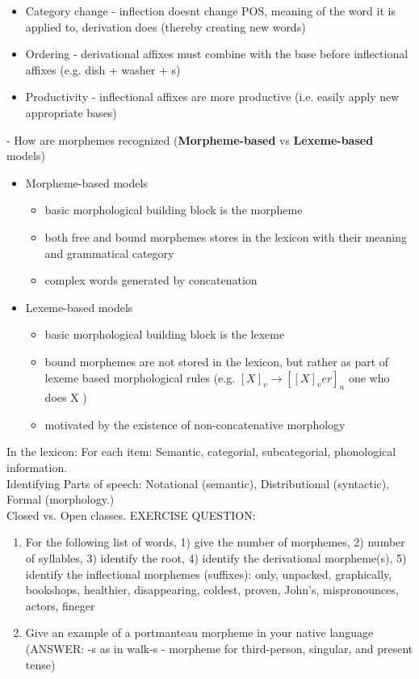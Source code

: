 \documentclass[11pt]{article}
\begin{document}
\begin{itemize}
 \item Category change - inflection doesnt change POS, meaning of the word it is applied to, derivation does (thereby creating new words)
 \item Ordering - derivational affixes must combine with the base before inflectional affixes (e.g. dish + washer + s)
 \item Productivity - inflectional affixes are more productive (i.e. easily apply new appropriate bases)
\end{itemize}
- How are morphemes recognized ({\bf Morpheme-based} vs {\bf Lexeme-based} models)
\begin{itemize}
 \item Morpheme-based models
  \begin{itemize}
   \item basic morphological building block is the morpheme
   \item both free and bound morphemes stores in the lexicon with their meaning and grammatical category
   \item complex words generated by concatenation
  \end{itemize}
 \item Lexeme-based models
  \begin{itemize}
   \item basic morphological building block is the lexeme
   \item bound morphemes are not stored in the lexicon, but rather as part of lexeme based morphological rules (e.g. $[X]_v \rightarrow [[X]_v er]_n$ one who does X ) 
   \item motivated by the existence of non-concatenative morphology
  \end{itemize}
\end{itemize}
In the lexicon: For each item: Semantic, categorial, subcategorial, phonological information.\\
Identifying Parts of speech: Notational (semantic), Distributional (syntactic), Formal (morphology.)\\
Closed vs. Open classes.
EXERCISE QUESTION:

\begin{enumerate}
 \item For the following list of words, 1) give the number of morphemes, 2) number of syllables, 3) identify the root, 4) identify the derivational morpheme(s), 5) identify the inflectional morphemes (suffixes): only, unpacked, graphically, bookshops, healthier, disappearing, coldest, proven, John's, mispronounces, actors, fineger
 \item Give an example of a portmanteau morpheme in your native language (ANSWER: -s as in walk-s - morpheme for third-person, singular, and present tense)
\end{enumerate}
\end{document}
